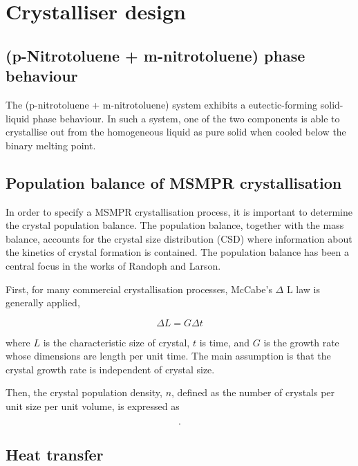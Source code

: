 \section{Crystalliser design}

\subsection{(p-Nitrotoluene + m-nitrotoluene) phase behaviour}

The (p-nitrotoluene + m-nitrotoluene) system exhibits a eutectic-forming solid-liquid phase behaviour. In such a system, one of the two components is able to crystallise out from the homogeneous liquid as pure solid when cooled below the binary melting point. 

\subsection{Population balance of MSMPR crystallisation}
In order to specify a MSMPR crystallisation process, it is important to determine the crystal population balance. The population balance, together with the mass balance, accounts for the crystal size distribution (CSD) where information about the kinetics of crystal formation is contained. The population balance has been a central focus in the works of Randoph and Larson. 

First, for many commercial crystallisation processes, McCabe's $\Delta$ L law is generally applied, 

\begin{equation} \label{eq: McCabe deltaL}
    \Delta L = G \Delta t
\end{equation}

\noindent where $L$ is the characteristic size of crystal, $t$ is time, and $G$ is the growth rate whose dimensions are length per unit time. The main assumption is that the crystal growth rate is independent of crystal size. 

Then, the crystal population density, $n$, defined as the number of crystals per unit size per unit volume, is expressed as 

\begin{equation} \label{eq:crystal population density definition}
    .
\end{equation}


\subsection{Heat transfer}
